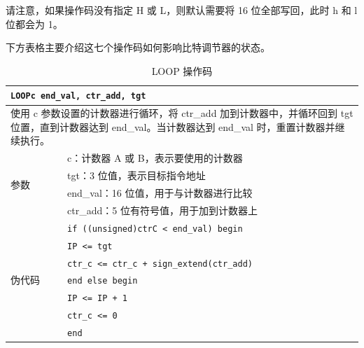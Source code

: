 \documentclass[main\_\_CN.tex]{subfiles}
\begin{document}
请注意，如果操作码没有指定 H 或 L，则默认需要将 16 位全部写回，此时 h 和 l 位都会为 1。

下方表格主要介绍这七个操作码如何影响比特调节器的状态。

\begin{table}[H]
\caption{LOOP 操作码}
\label{tab:bitscrm-loop-opcode}
\begin{tabular}{|l|l|}
\hline
\multicolumn{2}{|l|}{\texttt{LOOPc end\_val, ctr\_add, tgt}} \\
\hline
\multicolumn{2}{|L{17cm}|}{使用 c 参数设置的计数器进行循环，将 ctr\_add 加到计数器中，并循环回到 tgt 位置，直到计数器达到 end\_val。当计数器达到 end\_val 时，重置计数器并继续执行。} \\
\hline
\multirow{4}{*}{参数} & c：计数器 A 或 B，表示要使用的计数器 \\
& tgt：3 位值，表示目标指令地址\\
& end\_val：16 位值，用于与计数器进行比较 \\
& ctr\_add：5 位有符号值，用于加到计数器上 \\
\hline
\multirow{7}{*}{伪代码} & \texttt{if ((unsigned)ctrC < end\_val) begin} \\
& \hspace*{4mm} \texttt{IP <= tgt} \\
& \hspace*{4mm} \texttt{ctr\_c <= ctr\_c + sign\_extend(ctr\_add)} \\
& \texttt{end else begin} \\
& \hspace*{4mm} \texttt{IP <= IP + 1} \\
& \hspace*{4mm} \texttt{ctr\_c <= 0} \\
& \texttt{end} \\
\hline
\end{tabular}
\end{table}
\end{document}
